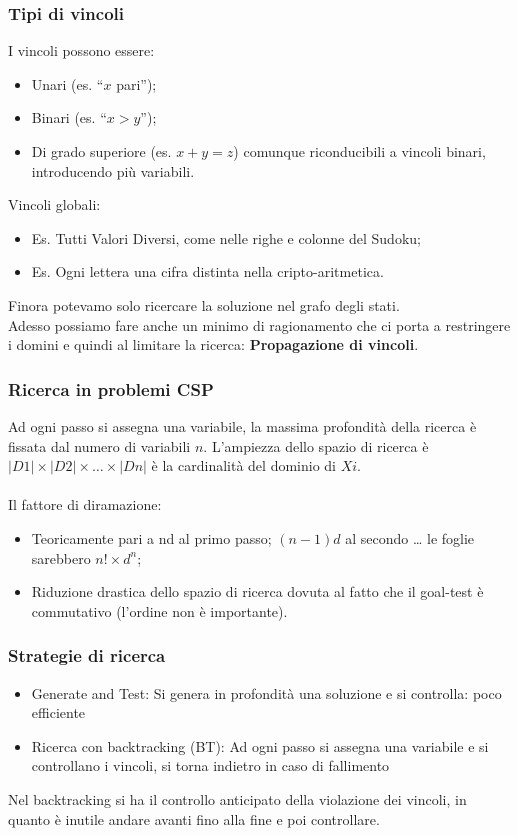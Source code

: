\documentclass[../main.tex]{subfiles}
\begin{document}
	\subsubsection{Tipi di vincoli}
	I vincoli possono essere:
	\begin{itemize}
		\item Unari (es. “$x$ pari”);
		\item Binari (es. “$x > y$”);
		\item Di grado superiore (es. $x+y = z$) comunque riconducibili a vincoli binari, introducendo più variabili.
	\end{itemize}
	Vincoli globali:
	\begin{itemize}
		\item Es. Tutti Valori Diversi, come nelle righe e colonne del Sudoku;
		\item Es. Ogni lettera una cifra distinta nella cripto-aritmetica.
	\end{itemize}
	Finora potevamo solo ricercare la soluzione nel grafo degli stati.\\
	Adesso possiamo fare anche un minimo di ragionamento che ci porta a restringere i domini e quindi al limitare la ricerca: \textbf{Propagazione di vincoli}.
	\subsubsection{Ricerca in problemi CSP}
	Ad ogni passo si assegna una variabile, la massima profondità della ricerca è fissata dal numero di variabili $n$.
	L’ampiezza dello spazio di ricerca è $|D1| \times |D2| \times \dots \times |Dn|$ è la cardinalità del dominio di $Xi$.\\ \\
	Il fattore di diramazione:
	\begin{itemize}
		\item Teoricamente pari a nd al primo passo; $(n-1) d$ al secondo … le foglie sarebbero $n! \times d^n$;
		\item Riduzione drastica dello spazio di ricerca dovuta al fatto che il goal-test è commutativo (l’ordine non è importante).
	\end{itemize}
	\subsubsection{Strategie di ricerca}
	\begin{itemize}
		\item Generate and Test: Si genera in profondità una soluzione e si controlla: poco efficiente
		\item Ricerca con backtracking (BT): Ad ogni passo si assegna una variabile e si controllano i vincoli, si torna indietro in caso di fallimento
	\end{itemize}
	Nel backtracking si ha il controllo anticipato della violazione dei vincoli, in quanto è inutile andare avanti fino alla fine e poi controllare.
\end{document}

